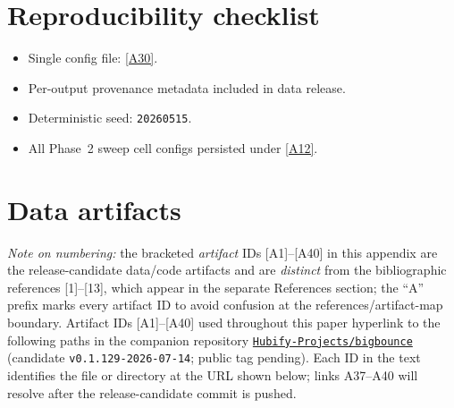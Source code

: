 \documentclass[aps,prd,twocolumn,superscriptaddress,showpacs,preprintnumbers,nofootinbib,longbibliography,floatfix]{revtex4-2}
\newcommand{\repoBase}{https://github.com/Hubify-Projects/bigbounce/blob/main}
\newcommand{\paperVersion}{v0.1.129-2026-07-14}
\begin{document}
\section*{Reproducibility checklist}
\begin{itemize}
\item Single config file:
\href{\repoBase/pipelines/p5\_desi\_chirality/env\_finder/config.yaml}{[A30]}.
\item Per-output provenance metadata included in data release.
\item Deterministic seed: \texttt{20260515}.
\item All Phase~2 sweep cell configs persisted under
\href{\repoBase/pipelines/p5\_desi\_chirality/data/desi\_env/phase2\_sweep}{[A12]}.
\end{itemize}

\section{Data artifacts}\label{app:artifacts}

\emph{Note on numbering:} the bracketed \emph{artifact} IDs
[A1]--[A40] in this appendix are the release-candidate data/code
artifacts and are \emph{distinct} from the bibliographic references
[1]--[13], which appear in the separate References section; the ``A''
prefix marks every artifact ID to avoid confusion at the
references/artifact-map boundary. Artifact IDs [A1]--[A40] used
throughout this paper hyperlink to the following paths in the companion
repository
\href{https://github.com/Hubify-Projects/bigbounce}{\texttt{Hubify-Projects/bigbounce}}
(candidate \texttt{\paperVersion}; public tag pending). Each ID in the
text identifies the file or directory at the URL shown below; links A37--A40
will resolve after the release-candidate commit is pushed.
\end{document}
